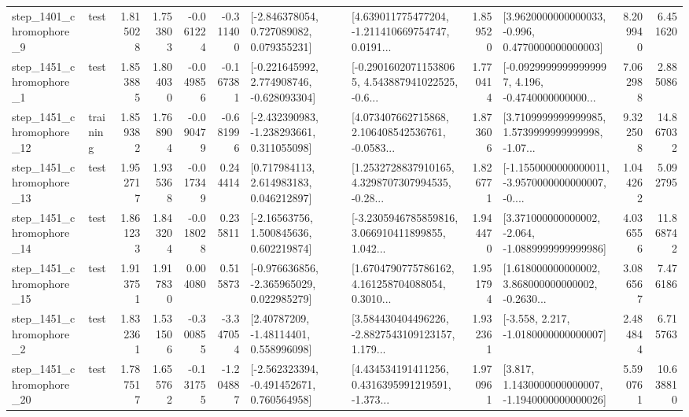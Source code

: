 \begin{tabular}{llrrrrllrlrr}
  step\_1401\_chromophore\_9 &      test &      1.815028 &    1.753803 &     -0.061224 & -0.311400 &    [-2.846378054, 0.727089082, 0.079355231] &  [4.639011775477204, -1.211410669754747, 0.0191... &       1.859520 &   [3.9620000000000033, -0.996, 0.4770000000000003] &            8.209940 &          6.451620 \\
  step\_1451\_chromophore\_1 &      test &      1.853885 &    1.804030 &     -0.049856 & -0.167381 &   [-0.221645992, 2.774908746, -0.628093304] &  [-0.29016020711538065, 4.543887941022525, -0.6... &       1.770414 &  [-0.09299999999999997, 4.196, -0.4740000000000... &            7.062988 &          2.885086 \\
 step\_1451\_chromophore\_12 &  training &      1.859382 &    1.768904 &     -0.090479 & -0.681996 &   [-2.432390983, -1.238293661, 0.311055098] &  [4.073407662715868, 2.106408542536761, -0.0583... &       1.873606 &  [3.7109999999999985, 1.5739999999999998, -1.07... &            9.322508 &         14.867032 \\
 step\_1451\_chromophore\_13 &      test &      1.952717 &    1.935368 &     -0.017349 &  0.244414 &     [0.717984113, 2.614983183, 0.046212897] &  [1.2532728837910165, 4.3298707307994535, -0.28... &       1.826771 &  [-1.1550000000000011, -3.9570000000000007, -0.... &            1.044262 &          5.092795 \\
 step\_1451\_chromophore\_14 &      test &      1.861233 &    1.843204 &     -0.018028 &  0.235811 &     [-2.16563756, 1.500845636, 0.602219874] &  [-3.2305946785859816, 3.066910411899855, 1.042... &       1.944470 &   [3.371000000000002, -2.064, -1.0889999999999986] &            4.036556 &         11.868742 \\
 step\_1451\_chromophore\_15 &      test &      1.913751 &    1.917830 &      0.004080 &  0.515873 &   [-0.976636856, -2.365965029, 0.022985279] &  [1.6704790775786162, 4.161258704088054, 0.3010... &       1.951794 &  [1.618000000000002, 3.868000000000002, -0.2630... &            3.086567 &          7.476186 \\
  step\_1451\_chromophore\_2 &      test &      1.832361 &    1.531506 &     -0.300855 & -3.347054 &      [2.40787209, -1.48114401, 0.558996098] &  [3.584430404496226, -2.8827543109123157, 1.179... &       1.932361 &               [-3.558, 2.217, -1.0180000000000007] &            2.484844 &          6.715763 \\
 step\_1451\_chromophore\_20 &      test &      1.787517 &    1.655762 &     -0.131755 & -1.204887 &   [-2.562323394, -0.491452671, 0.760564958] &  [4.434534191411256, 0.4316395991219591, -1.373... &       1.970961 &   [3.817, 1.1430000000000007, -1.1940000000000026] &            5.590761 &         10.638810 \\

\end{tabular}
